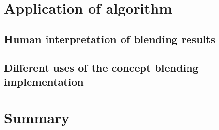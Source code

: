 



\section{Application of algorithm}

\subsection{Human interpretation of blending results}


\subsection{Different uses of the concept blending implementation}




\section{Summary}

